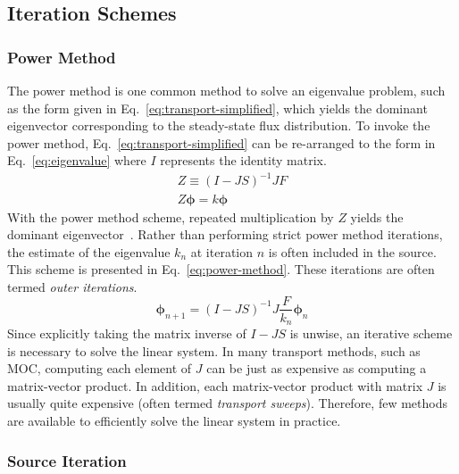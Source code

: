 \subsection{Iteration Schemes}
\label{sec:moc-iteration-schemes}

\subsubsection{Power Method}

The power method is one common method to solve an eigenvalue problem, such as the form given in Eq.~\ref{eq:transport-simplified}, which yields the dominant eigenvector corresponding to the steady-state flux distribution. To invoke the power method, Eq.~\ref{eq:transport-simplified} can be re-arranged to the form in Eq.~\ref{eq:eigenvalue} where $I$ represents the identity matrix.
\begin{equation}
\begin{split}
Z \equiv \left(I-JS\right)^{-1} JF \\
Z \boldsymbol{\phi} =  k \boldsymbol{\phi}
\end{split}
\label{eq:eigenvalue}
\end{equation}
With the power method scheme, repeated multiplication by $Z$ yields the dominant eigenvector~\cite{numerical-analysis}. Rather than performing strict power method iterations, the estimate of the eigenvalue $k_n$ at iteration $n$ is often included in the source. This scheme is presented in Eq.~\ref{eq:power-method}. These iterations are often termed \textit{outer iterations}.
\begin{equation}
\boldsymbol{\phi}_{n+1} =  \left(I-JS\right)^{-1} J\frac{F}{k_n} \boldsymbol{\phi}_n
\label{eq:power-method}
\end{equation}
Since explicitly taking the matrix inverse of $I-JS$ is unwise, an iterative scheme is necessary to solve the linear system. In many transport methods, such as \ac{MOC}, computing each element of $J$ can be just as expensive as computing a matrix-vector product. In addition, each matrix-vector product with matrix $J$ is usually quite expensive (often termed \textit{transport sweeps}). Therefore, few methods are available to efficiently solve the linear system in practice. 

\subsubsection{Source Iteration}

